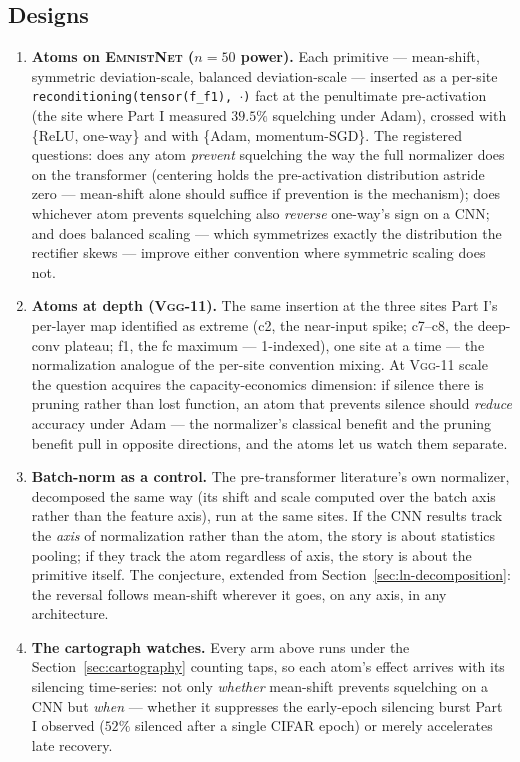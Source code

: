 \documentclass[11pt]{article}
\newcommand{\modelEmnistNet}{\textsc{EmnistNet}\xspace}
\newcommand{\modelVggEleven}{\textsc{Vgg-11}\xspace}
\begin{document}
\subsection{Designs}

\begin{enumerate}
\item \textbf{Atoms on \modelEmnistNet{} ($n{=}50$ power).} Each
primitive --- mean-shift, symmetric deviation-scale, balanced
deviation-scale --- inserted as a per-site
\texttt{reconditioning(tensor(f\_f1), $\cdot$)} fact at the
penultimate pre-activation (the site where Part I measured $39.5\%$
squelching under Adam), crossed with \{ReLU, one-way\} and with
\{Adam, momentum-SGD\}. The registered questions: does any atom
\emph{prevent} squelching the way the full normalizer does on the
transformer (centering holds the pre-activation distribution astride
zero --- mean-shift alone should suffice if prevention is the
mechanism); does whichever atom prevents squelching also
\emph{reverse} one-way's sign on a CNN; and does balanced scaling
--- which symmetrizes exactly the distribution the rectifier skews
--- improve either convention where symmetric scaling does not.
\item \textbf{Atoms at depth (\modelVggEleven{}).} The same
insertion at the three sites Part I's per-layer map identified as
extreme (c2, the near-input spike; c7--c8, the deep-conv plateau;
f1, the fc maximum --- 1-indexed), one site at a time --- the normalization
analogue of the per-site convention mixing. At \modelVggEleven{}
scale the question acquires the capacity-economics dimension: if
silence there is pruning rather than lost function, an atom that prevents
silence should \emph{reduce} accuracy under Adam --- the
normalizer's classical benefit and the pruning benefit pull in
opposite directions, and the atoms let us watch them separate.
\item \textbf{Batch-norm as a control.} The pre-transformer
literature's own normalizer, decomposed the same way (its shift and
scale computed over the batch axis rather than the feature axis),
run at the same sites. If the CNN results track the \emph{axis} of
normalization rather than the atom, the story is about statistics
pooling; if they track the atom regardless of axis, the story is
about the primitive itself. The conjecture, extended from
Section~\ref{sec:ln-decomposition}: the reversal follows mean-shift
wherever it goes, on any axis, in any architecture.
\item \textbf{The cartograph watches.} Every arm above runs under
the Section~\ref{sec:cartography} counting taps, so each atom's
effect arrives with its silencing time-series: not only
\emph{whether} mean-shift prevents squelching on a CNN but
\emph{when} --- whether it suppresses the early-epoch silencing
burst Part I observed ($52\%$ silenced after a single CIFAR epoch) or
merely accelerates late recovery.
\end{enumerate}
\end{document}
